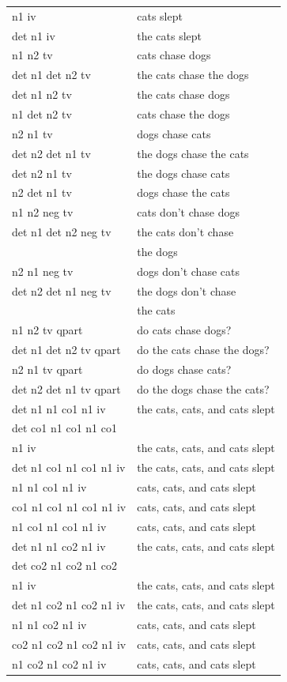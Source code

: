 \documentclass[11pt]{article}
\begin{document}
\hspace{-15pt}
\begin{tabular}{ll}
n1 iv & cats slept\\
det n1 iv & the cats slept \\
n1 n2 tv & cats chase dogs\\
det n1 det n2 tv & the cats chase the dogs\\
det n1 n2 tv & the cats chase dogs\\
n1 det n2 tv & cats chase the dogs\\
n2 n1 tv & dogs chase cats\\
det n2 det n1 tv & the dogs chase the cats\\
det n2 n1 tv & the dogs chase cats\\
n2 det n1 tv & dogs chase the cats\\
n1 n2 neg tv & cats don't chase dogs\\
det n1 det n2 neg tv & the cats don't chase \\
 & \phantom{...}the dogs\\
n2 n1 neg tv & dogs don't chase cats\\
det n2 det n1 neg tv & the dogs don't chase \\
 & \phantom{...}the cats\\
n1 n2 tv qpart & do cats chase dogs?\\
det n1 det n2 tv qpart & do the cats chase the dogs?\\
n2 n1 tv qpart & do dogs chase cats?\\
det n2 det n1 tv qpart & do the dogs chase the cats?\\
det n1 n1 co1 n1 iv & the cats, cats, and cats slept\\
det co1 n1 co1 n1 co1 & \\
\phantom{...}n1 iv & the cats, cats, and cats slept\\
det n1 co1 n1 co1 n1 iv & the cats, cats, and cats slept\\
n1 n1 co1 n1 iv & cats, cats, and cats slept\\
co1 n1 co1 n1 co1 n1 iv & cats, cats, and cats slept\\
n1 co1 n1 co1 n1 iv & cats, cats, and cats slept\\
det n1 n1 co2 n1 iv & the cats, cats, and cats slept\\
det co2 n1 co2 n1 co2 & \\
\phantom{...}n1 iv & the cats, cats, and cats slept\\
det n1 co2 n1 co2 n1 iv & the cats, cats, and cats slept\\
n1 n1 co2 n1 iv & cats, cats, and cats slept\\
co2 n1 co2 n1 co2 n1 iv & cats, cats, and cats slept\\
n1 co2 n1 co2 n1 iv & cats, cats, and cats slept\\
\end{tabular}




\end{document}
